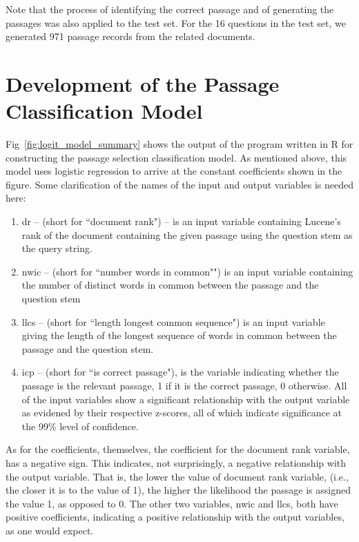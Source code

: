 Note that the process of identifying the correct passage and of generating the passages was also applied to the test set.  For the 16 questions in the test set, we generated 971 passage records from the related documents.


\section{Development of the Passage Classification Model}

Fig~\ref{fig:logit_model_summary} shows the output of the program written in R \cite{james_2013_introduction_ch4} for constructing the passage selection classification model.  As mentioned above, this model uses logistic regression to arrive at the constant coefficients shown in the figure.  Some clarification of the names of the input and output variables is needed here:  

\begin{enumerate}
\item dr -- (short for ``document rank") -- is an input variable containing Lucene's rank of the document containing the given passage using the question stem as the query string.
\item nwic -- (short for ``number words in common"") is an input variable containing the number of distinct words in common between the passage and the question stem
\item llcs -- (short for ``length longest common sequence") is an input variable giving the length of the longest sequence of words in common between the passage and the question stem.  
\item icp -- (short for ``is correct passage"), is the variable indicating whether the passage is the relevant passage, 1 if it is the correct passage, 0 otherwise.  All of the input variables show a significant relationship with the output variable as evidened by their respective z-scores, all of which indicate significance at the 99\% level of confidence.
\end{enumerate}

As for the coefficients, themselves, the coefficient for the document rank variable, has a negative sign.  This indicates, not surprisingly, a negative relationship with the output variable.  That is, the lower the value of document rank variable, (i.e., the closer it is to the value of 1), the higher the likelihood the passage is assigned the value 1, as opposed to 0.  The other two variables, nwic and llcs, both have positive coefficients, indicating a positive relationship with the output variables, as one would expect.

